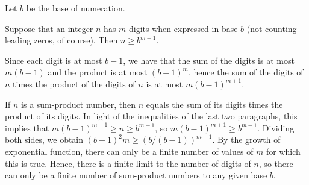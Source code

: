 \documentclass[12pt]{article}
\begin{document}
Let $b$ be the base of numeration.

Suppose that an integer $n$ has $m$ digits when expressed in base $b$
(not counting leading zeros, of course).  Then $n \ge b^{m-1}$.

Since each digit is at most $b-1$, we have that the sum of the digits
is at most $m(b-1)$ and the product is at most $(b-1)^m$, hence the
sum of the digits of $n$ times the product of the digits of $n$ is at
most $m(b-1)^{m+1}$.

If $n$ is a sum-product number, then $n$ equals the sum of its digits
times the product of its digits.  In light of the inequalities of the
last two paragraphs, this implies that $m(b-1)^{m+1} \ge n \ge
b^{m-1}$, so $m(b-1)^{m+1} \ge b^{m-1}$.  Dividing both sides, we
obtain $(b-1)^2 m \ge (b/(b-1))^{m-1}$.  By the growth of exponential
function, there can only be a finite number of values of $m$ for which
this is true.  Hence, there is a finite limit to the number of digits
of $n$, so there can only be a finite number of sum-product numbers to
any given base $b$.
\end{document}
